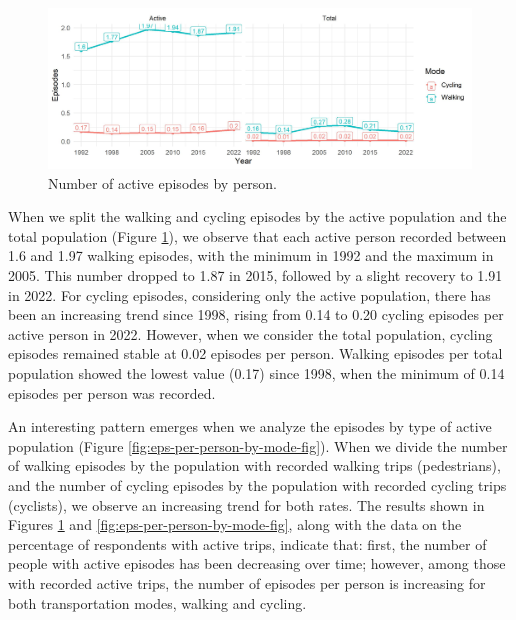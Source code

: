 \documentclass[preprint, 3p,
authoryear]{elsarticle} %
\begin{document}
\begin{figure}

{\centering \includegraphics[width=1\linewidth]{figures/episodes_per_person_act_total} 

}

\caption{Number of active episodes by person.}\label{fig:eps-per-person-act-total-fig}
\end{figure}

When we split the walking and cycling episodes by the active population
and the total population (Figure
\ref{fig:eps-per-person-act-total-fig}), we observe that each active
person recorded between 1.6 and 1.97 walking episodes, with the minimum
in 1992 and the maximum in 2005. This number dropped to 1.87 in 2015,
followed by a slight recovery to 1.91 in 2022. For cycling episodes,
considering only the active population, there has been an increasing
trend since 1998, rising from 0.14 to 0.20 cycling episodes per active
person in 2022. However, when we consider the total population, cycling
episodes remained stable at 0.02 episodes per person. Walking episodes
per total population showed the lowest value (0.17) since 1998, when the
minimum of 0.14 episodes per person was recorded.

An interesting pattern emerges when we analyze the episodes by type of
active population (Figure \ref{fig:eps-per-person-by-mode-fig}). When we
divide the number of walking episodes by the population with recorded
walking trips (pedestrians), and the number of cycling episodes by the
population with recorded cycling trips (cyclists), we observe an
increasing trend for both rates. The results shown in Figures
\ref{fig:eps-per-person-act-total-fig} and
\ref{fig:eps-per-person-by-mode-fig}, along with the data on the
percentage of respondents with active trips, indicate that: first, the
number of people with active episodes has been decreasing over time;
however, among those with recorded active trips, the number of episodes
per person is increasing for both transportation modes, walking and
cycling.
\end{document}
